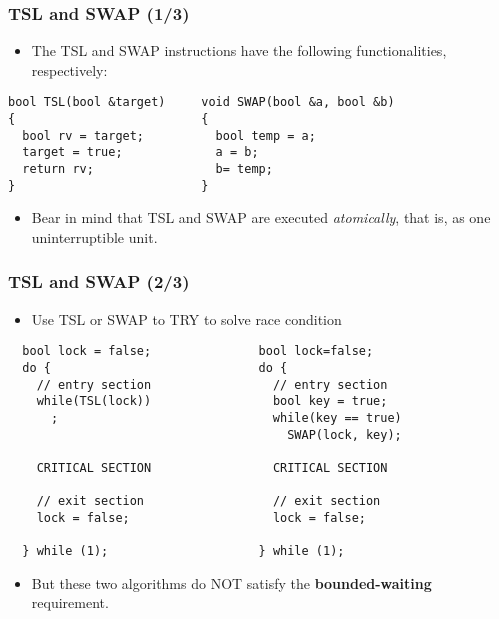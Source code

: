 \documentclass[CJKutf8,dvipsnames,table]{beamer}
\begin{document}
\begin{CJK*}{UTF8}{song}
  \begin{frame}[fragile]
  \frametitle{TSL and SWAP (1/3)} \pause
  \begin{itemize}
  \item The TSL and SWAP instructions have the following functionalities, respectively:  \pause
  \end{itemize}

\begin{lstlisting}
bool TSL(bool &target)     void SWAP(bool &a, bool &b)
{                          {
  bool rv = target;          bool temp = a;
  target = true;             a = b;
  return rv;                 b= temp;
}                          }
\end{lstlisting}

  \pause

  \begin{itemize}
  \item Bear in mind that TSL and SWAP are executed \emph{atomically}, that is, as one uninterruptible unit. 
  \end{itemize}
\end{frame}

  \begin{frame}[fragile]
  \frametitle{TSL and SWAP (2/3)} \pause
  \begin{itemize}
  \item Use TSL or SWAP to TRY to solve race condition  \pause
  \end{itemize}

\begin{lstlisting}
  bool lock = false;               bool lock=false;
  do {                             do {
    // entry section                 // entry section
    while(TSL(lock))                 bool key = true;
      ;                              while(key == true)
                                       SWAP(lock, key);

    CRITICAL SECTION                 CRITICAL SECTION

    // exit section                  // exit section
    lock = false;                    lock = false;

  } while (1);                     } while (1);
\end{lstlisting}

  \pause

  \begin{itemize}
  \item But these two algorithms do NOT satisfy the \textbf{bounded-waiting} requirement. 
  \end{itemize}
\end{frame}


\end{CJK*}
\end{document}
